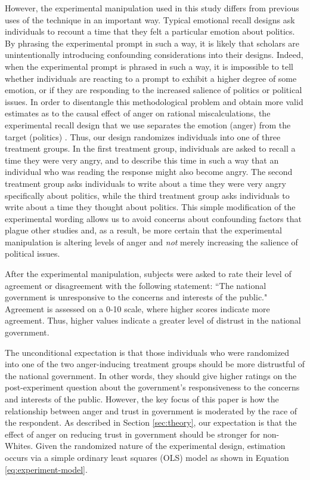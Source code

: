\documentclass[12t, letterpaper]{article}
\begin{document}
However, the experimental manipulation used in this study differs from previous uses of the technique in an important way. Typical emotional recall designs ask individuals to recount a time that they felt a particular emotion about politics. By phrasing the experimental prompt in such a way, it is likely that scholars are unintentionally introducing confounding considerations into their designs. Indeed, when the experimental prompt is phrased in such a way, it is impossible to tell whether individuals are reacting to a prompt to exhibit a higher degree of some emotion, or if they are responding to the increased salience of politics or political issues. In order to disentangle this methodological problem and obtain more valid estimates as to the causal effect of anger on rational miscalculations, the experimental recall design that we use separates the emotion (anger) from the target (politics) \citep[see also,][]{webster2017}. Thus, our design randomizes individuals into one of three treatment groups. In the first treatment group, individuals are asked to recall a time they were very angry, and to describe this time in such a way that an individual who was reading the response might also become angry. The second treatment group asks individuals to write about a time they were very angry specifically about politics, while the third treatment group asks individuals to write about a time they thought about politics. This simple modification of the experimental wording allows us to avoid concerns about confounding factors that plague other studies and, as a result, be more certain that the experimental manipulation is altering levels of anger and \emph{not} merely increasing the salience of political issues.

After the experimental manipulation, subjects were asked to rate their level of agreement or disagreement with the following statement: ``The national government is unresponsive to the concerns and interests of the public." Agreement is assessed on a 0-10 scale, where higher scores indicate more agreement. Thus, higher values indicate a greater level of distrust in the national government.

The unconditional expectation is that those individuals who were randomized into one of the two anger-inducing treatment groups should be more distrustful of the national government. In other words, they should give higher ratings on the post-experiment question about the government's responsiveness to the concerns and interests of the public. However, the key focus of this paper is how the relationship between anger and trust in government is moderated by the race of the respondent. As described in Section \ref{sec:theory}, our expectation is that the effect of anger on reducing trust in government should be stronger for non-Whites. Given the randomized nature of the experimental design, estimation occurs via a simple ordinary least squares (OLS) model as shown in Equation \ref{eq:experiment-model}.
\end{document}
